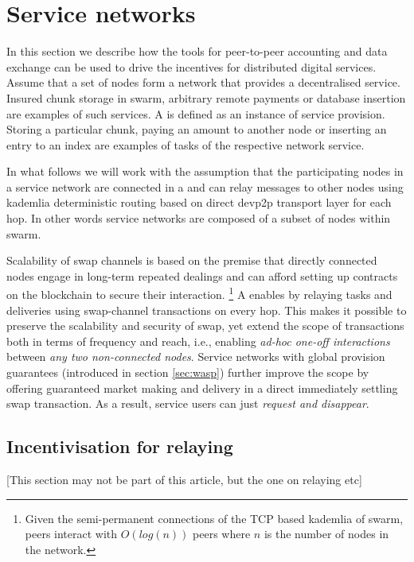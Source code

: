 \section{Service networks}
\label{sec:networks}

In this section we describe how the tools for peer-to-peer accounting and data exchange can be used to drive the incentives for distributed digital services. Assume that a set of nodes form a network that provides a decentralised service. Insured chunk storage in swarm, arbitrary remote payments or database insertion are examples of such services. 
A  is defined as an instance of service provision. Storing a particular chunk, paying an amount to another node or inserting an entry to an index are examples of tasks of the respective network service.

In what follows we will work with the assumption that the participating nodes in a service network are connected in a  and can relay messages to other nodes using kademlia deterministic routing based on direct devp2p transport layer for each hop. In other words service networks are composed of a subset of nodes within swarm.

Scalability of swap channels is based on the premise that directly connected nodes engage in long-term repeated dealings and can afford setting up contracts on the blockchain to secure their interaction.%
%
\footnote{Given the semi-permanent connections of the TCP based kademlia of swarm, peers interact with $O(log(n))$ peers where $n$ is the number of nodes in the network.}
%
A  enables  by relaying tasks and deliveries using swap-channel transactions on every hop. This makes it possible to preserve the scalability and security of swap, yet extend the scope of transactions both in terms of frequency and reach, i.e., enabling \emph{ad-hoc one-off interactions} between \emph{any two non-connected nodes}. 
Service networks with global provision guarantees (introduced in section \ref{sec:wasp}) further improve the scope by offering guaranteed market making and delivery in a direct immediately settling swap transaction. As a result, service users can just \emph{request and disappear}.

\subsection{Incentivisation for relaying}

[This section may not be part of this article, but the one on relaying etc]

